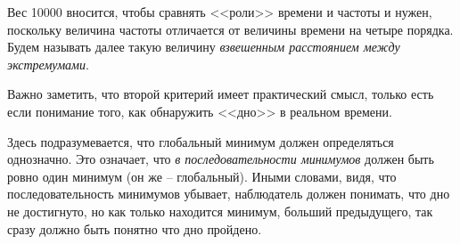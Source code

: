 Вес 10000 вносится, чтобы сравнять <<роли>> времени и частоты и нужен, поскольку величина частоты отличается от величины времени на четыре порядка. Будем называть далее такую величину \textit{взвешенным расстоянием между экстремумами}.

Важно заметить, что второй критерий имеет практический смысл, только есть если понимание того, как обнаружить <<дно>> в реальном времени.

Здесь подразумевается, что глобальный минимум должен определяться однозначно. Это означает, что \textit{в последовательности минимумов} должен быть ровно один минимум (он же -- глобальный). Иными словами, видя, что последовательность минимумов убывает, наблюдатель должен понимать, что дно не достигнуто, но как только находится минимум, больший предыдущего, так сразу должно быть понятно что дно пройдено.